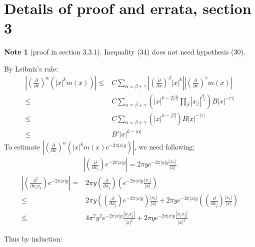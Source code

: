 \documentclass{report}
\theoremstyle{definition}
\newtheorem{note}{Note}
\theoremstyle{definition}
\theoremstyle{plain}
\numberwithin{theorem}{section}
\numberwithin{remark}{section}
\numberwithin{equation}{section}
\newcommand{\abs}[1]{\left\lvert#1\right\rvert}
\begin{document}
\section{Details of proof and errata, section 3}
\begin{note}[proof in section 3.3.1]
    Inequality (34) does not need hypothesis (30).\par
    By Leibniz's rule:
    \begin{align*}
            \abs{(\frac{\partial}{\partial x})^\alpha (\abs{x}^km(x))}\leq& C\sum_{\alpha=\beta+\gamma}\abs{(\frac{\partial}{\partial x})^\beta\abs{x}^k}\abs{(\frac{\partial}{\partial x})^\gamma m(x)}\\
            \leq &C\sum_{\alpha=\beta+\gamma} (\abs{x}^{k-2\abs{\beta}}\prod_{\beta}\abs{x_j}^{\beta_j})B\abs{x}^{-\abs{\gamma}}\\
            \leq &C\sum_{\alpha=\beta+\gamma} (\abs{x}^{k-\abs{\beta}})B\abs{x}^{-\abs{\gamma}}\\
            \leq &B'\abs{x}^{k-\abs{\alpha}}
    \end{align*}
    To estimate $\abs{(\frac{\partial}{\partial x})^\alpha (\abs{x}^km(x)e^{-2\pi\abs{x}y})}$, we need following:
    \begin{align*}
        \abs{(\frac{\partial}{\partial x_i}) e^{-2\pi\abs{x}y}}=2\pi y e^{-2\pi\abs{x}y}\frac{\abs{x_i}}{\abs{x}}
    \end{align*} 
    \begin{align*}
        \abs{(\frac{\partial^2}{\partial x_ix_j}) e^{-2\pi\abs{x}y}}=&2\pi y (\frac{\partial}{\partial x_j})(e^{-2\pi\abs{x}y}\frac{\abs{x_i}}{\abs{x}})\\
        \leq&2\pi y\left(  (\frac{\partial}{\partial x_j})e^{-2\pi\abs{x}y} \right)\frac{\abs{x_i}}{\abs{x}}+2\pi ye^{-2\pi\abs{x}y}\left((\frac{\partial}{\partial x_j})\frac{\abs{x_i}}{\abs{x}}\right)\\
        \leq&4\pi^2 y^2 e^{-2\pi\abs{x}y} \frac{\abs{x_ix_j}}{\abs{x}^2}+2\pi ye^{-2\pi\abs{x}y}\frac{\abs{x_ix_j}}{\abs{x}^3}
    \end{align*} 
    
    Thus by induction:


\end{note}
\end{document}

